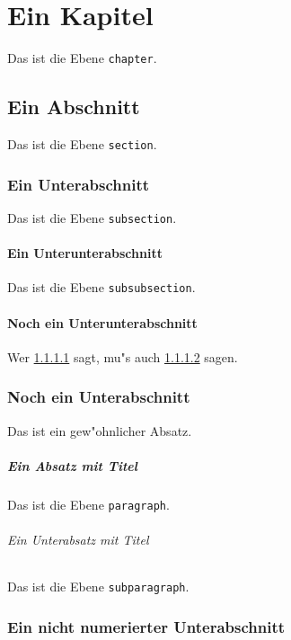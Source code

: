 \chapter{Ein Kapitel}

Das ist die Ebene {\tt chapter}.

\section{Ein Abschnitt}

Das ist die Ebene {\tt section}.

\subsection{Ein Unterabschnitt}

Das ist die Ebene {\tt subsection}.

\subsubsection{Ein Unterunterabschnitt}
\label{sec:a}

Das ist die Ebene {\tt subsubsection}.

\subsubsection{Noch ein Unterunterabschnitt}
\label{sec:b}

Wer \ref{sec:a} sagt, mu"s auch \ref{sec:b} sagen.

\subsection{Noch ein Unterabschnitt}

Das ist ein gew"ohnlicher Absatz.

\paragraph{Ein Absatz mit Titel}

Das ist die Ebene {\tt paragraph}.

\subparagraph{Ein Unterabsatz mit Titel}

Das ist die Ebene {\tt subparagraph}.

\subsection*{Ein nicht numerierter Unterabschnitt}

